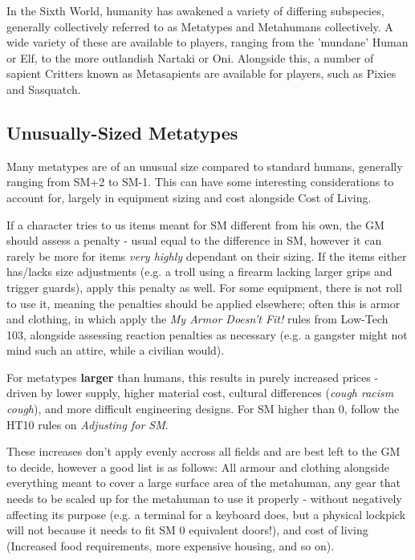 
\begin{multicols*}{3}
	
	In the Sixth World, humanity has awakened a variety of differing subspecies, generally collectively referred to as Metatypes and Metahumans collectively. A wide variety of these are available to players, ranging from the 'mundane' Human or Elf, to the more outlandish Nartaki or Oni. Alongside this, a number of sapient Critters known as Metasapients are available for players, such as Pixies and Sasquatch.
	
	\subsection{Unusually-Sized Metatypes}\label{metatype_sizing}
	
	Many metatypes are of an unusual size compared to standard humans, generally ranging from SM+2 to SM-1. This can have some interesting considerations to account for, largely in equipment sizing and cost alongside Cost of Living.
	
	If a character tries to us items meant for SM different from his own, the GM should assess a penalty - usual equal to the difference in SM, however it can rarely be more for items \textit{very highly} dependant on their sizing. If the items either has/lacks size adjustments (e.g. a troll using a firearm lacking larger grips and trigger guards), apply this penalty as well. For some equipment, there is not roll to use it, meaning the penalties should be applied elsewhere; often this is armor and clothing, in which apply the \textit{My Armor Doesn't Fit!} rules from Low-Tech 103, alongside assessing reaction penalties as necessary (e.g. a gangster might not mind such an attire, while a civilian would).
	
	For metatypes \textbf{larger} than humans, this results in purely increased prices - driven by lower supply, higher material cost, cultural differences (\textit{cough racism cough}), and  more difficult engineering designs. For SM higher than 0, follow the HT10 rules on \textit{Adjusting for SM}.
	
	These increases don't apply evenly accross all fields and are best left to the GM to decide, however a good list is as follows: All armour and clothing alongside everything meant to cover a large surface area of the metahuman, any gear that needs to be scaled up for the metahuman to use it properly - without negatively affecting its purpose (e.g. a terminal for a keyboard does, but a physical lockpick will not because it needs to fit SM 0 equivalent doors!), and cost of living (Increased food requirements, more expensive housing, and so on).
	

\end{multicols*}
